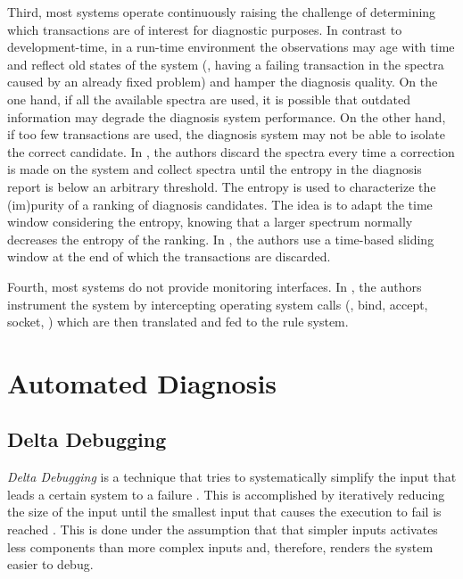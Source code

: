 Third, most systems operate continuously raising the challenge of
determining which transactions are of interest for diagnostic
purposes.
%
In contrast to development-time, in a run-time environment the
observations may age with time and reflect old states of the system
(\eg, having a failing transaction in the spectra caused by an
already fixed problem) and hamper the diagnosis quality.
%
On the one hand, if all the available spectra are used, it is possible
that outdated information may degrade the diagnosis system
performance.
%
On the other hand, if too few transactions are used, the diagnosis
system may not be able to isolate the correct candidate.
%
In \citep{Casanova13}, the authors discard the spectra every time a
correction is made on the system and collect spectra until the entropy
in the diagnosis report is below an arbitrary threshold.
%
The entropy is used to characterize the (im)purity of a ranking of
diagnosis candidates.
%
The idea is to adapt the time window considering the entropy, knowing
that a larger spectrum normally decreases the entropy of the ranking.
%
In \citep{Piel12}, the authors use a time-based sliding window at the
end of which the transactions are discarded.
%

Fourth, most systems do not provide monitoring interfaces.
%
In \citep{Casanova13}, the authors instrument the system by
intercepting operating system calls (\eg, bind, accept, socket, \etc)
which are then translated and fed to the rule system.



\section{Automated Diagnosis}
\subsection*{Delta Debugging}
\emph{Delta Debugging} is a technique that tries to systematically
simplify the input that leads a certain system to a failure
\citep{Zeller02a}.
%
This is accomplished by iteratively reducing the size of the input
until the smallest input that causes the execution to fail is reached
\citep{Zeller02b,Cleve05}.
%
This is done under the assumption that that simpler inputs activates
less components than more complex inputs and, therefore, renders the
system easier to debug.


